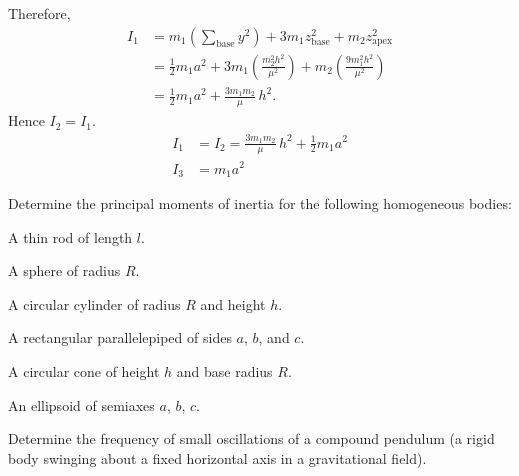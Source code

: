 \begin{subproblem}
{Therefore,
\begin{align*}
    I_1
    &= m_1\left(\sum_{\text{base}} y^2\right) + 3m_1 z_{\text{base}}^2 + m_2 z_{\text{apex}}^2 \\
    &= \frac12 m_1 a^2 + 3m_1\left(\frac{m_2^2 h^2}{\mu^2}\right) + m_2\left(\frac{9m_1^2 h^2}{\mu^2}\right) \\
    &= \frac12 m_1 a^2 + \frac{3m_1m_2}{\mu}\,h^2.
\end{align*}
Hence $I_2=I_1$.
}
{
\begin{align*}
    I_1&=I_2=\frac{3m_1m_2}{\mu}\,h^2+\frac12 m_1 a^2 \\
    I_3&=m_1 a^2
\end{align*}
}
\end{subproblem}


\begin{problem}[title={Moments of inertia of homogeneous bodies}]
{
Determine the principal moments of inertia for the following homogeneous bodies:
}{}{}
\end{problem}
\begin{subproblem}
{
A thin rod of length $l$.
}
{}
{}
\end{subproblem}

\begin{subproblem}
{
A sphere of radius $R$.
}
{}
{}
\end{subproblem}

\begin{subproblem}
{
A circular cylinder of radius $R$ and height $h$.
}
{}
{}
\end{subproblem}

\begin{subproblem}
{
A rectangular parallelepiped of sides $a$, $b$, and $c$.
}
{}
{}
\end{subproblem}

\begin{subproblem}
{
A circular cone of height $h$ and base radius $R$.
}
{}
{}
\end{subproblem}

\begin{subproblem}
{
An ellipsoid of semiaxes $a$, $b$, $c$.
}
{}
{}
\end{subproblem}


\begin{problem}[title={Frequency of a compound pendulum}]
{
Determine the frequency of small oscillations of a compound pendulum (a rigid body swinging about a fixed horizontal axis in a gravitational field).
}
{}
{}
\end{problem}

